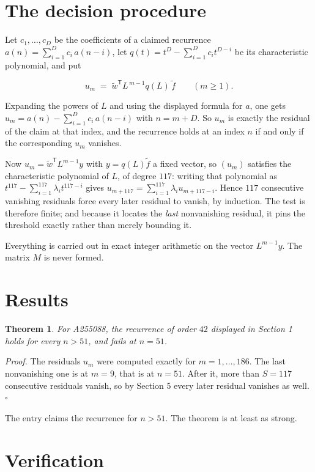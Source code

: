\documentclass[11pt]{article}
\newtheorem{theorem}{Theorem}
\theoremstyle{definition}
\begin{document}
\section{The decision procedure}

Let $c_1,\dots,c_D$ be the coefficients of a claimed recurrence $a(n) = \sum_{i=1}^{D} c_i\,a(n-i)$, let $q(t) = t^{D} - \sum_{i=1}^{D} c_i t^{D-i}$ be its characteristic polynomial, and put

\[u_m \;=\; \tilde w^{\mathsf T} L^{\,m-1} q(L)\,\tilde f \qquad (m \ge 1).\]

Expanding the powers of $L$ and using the displayed formula for $a$, one gets $u_m = a(n) - \sum_{i=1}^{D} c_i\,a(n-i)$ with $n = m + D$. So $u_m$ is exactly the residual of the claim at that index, and the recurrence holds at an index $n$ if and only if the corresponding $u_m$ vanishes.

Now $u_m = \tilde w^{\mathsf T} L^{m-1} y$ with $y = q(L)\tilde f$ a fixed vector, so $(u_m)$ satisfies the characteristic polynomial of $L$, of degree $117$: writing that polynomial as $t^{117} - \sum_{i=1}^{117} \lambda_i t^{117-i}$ gives $u_{m+117} = \sum_{i=1}^{117} \lambda_i u_{m+117-i}$. Hence $117$ consecutive vanishing residuals force every later residual to vanish, by induction. The test is therefore finite; and because it locates the {\itshape last} nonvanishing residual, it pins the threshold exactly rather than merely bounding it.

Everything is carried out in exact integer arithmetic on the vector $L^{m-1}y$. The matrix $M$ is never formed.

\section{Results}

\begin{theorem} For A255088, the recurrence of order $42$ displayed in Section 1 holds for every $n > 51$, and fails at $n = 51$.\end{theorem}

{\itshape Proof.} The residuals $u_m$ were computed exactly for $m = 1,\dots,186$. The last nonvanishing one is at $m = 9$, that is at $n = 51$. After it, more than $S = 117$ consecutive residuals vanish, so by Section 5 every later residual vanishes as well. $\square$

The entry claims the recurrence for $n > 51$. The theorem is at least as strong.

\section{Verification}
\end{document}
